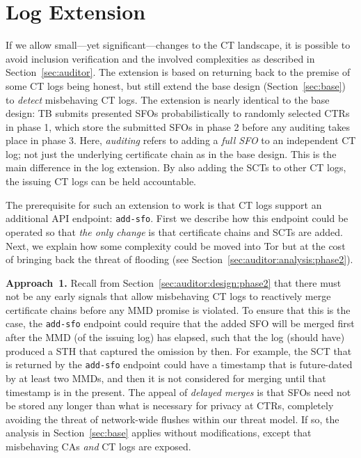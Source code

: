 \section{Log Extension} \label{sec:log}
If we allow small---yet significant---changes to the CT landscape, it is
possible to avoid inclusion verification and the involved complexities as
described in Section~\ref{sec:auditor}.  The extension is based on returning
back to the premise of some CT logs being honest, but still extend the base
design (Section~\ref{sec:base}) to \emph{detect} misbehaving CT logs. The
extension is nearly identical to the base design: TB submits presented SFOs
probabilistically to randomly selected CTRs in phase 1, which store the
submitted SFOs in phase 2 before any auditing takes place in phase 3. Here,
\emph{auditing} refers to adding a \emph{full SFO} to an independent CT log; not
just the underlying certificate chain as in the base design.  This is the main
difference in the log extension. By also adding the SCTs to other CT logs, the
issuing CT logs can be held accountable.

The prerequisite for such an extension to work is that CT logs support an
additional API endpoint:
	\texttt{add-sfo}.
First we describe how this endpoint could be operated so that \emph{the only
change} is that certificate chains and SCTs are added.  Next, we explain how
some complexity could be moved into Tor but at the cost of bringing back the
threat of flooding (see Section~\ref{sec:auditor:analysis:phase2}).

\textbf{Approach~1.}
Recall from Section~\ref{sec:auditor:design:phase2} that there must not be any
early signals that allow misbehaving CT logs to reactively merge certificate
chains before any MMD promise is violated.  To ensure that this is the case, the
\texttt{add-sfo} endpoint could require that the added SFO will be merged first
after the MMD (of the issuing log) has elapsed, such that the log (should have)
produced a STH that captured the omission by then.  For example, the SCT that is
returned by the \texttt{add-sfo} endpoint could have a timestamp that is
future-dated by at least two MMDs, and then it is not considered for merging
until that timestamp is in the present. The appeal of \emph{delayed merges} is
that SFOs need not be stored any longer than what is necessary for privacy at
CTRs, completely avoiding the threat of network-wide flushes within our threat
model. If so, the analysis in Section~\ref{sec:base} applies without
modifications, except that misbehaving CAs \emph{and} CT logs are exposed.

